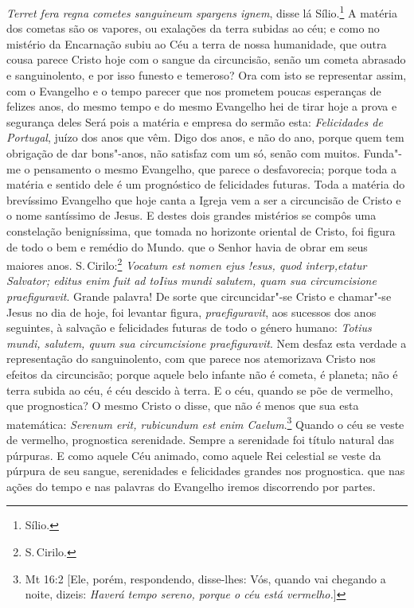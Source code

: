 \emph{Terret fera regna cometes sanguineum spargens ignem}, disse lá
Sílio.\footnote{Sílio.} A matéria dos cometas são os vapores, ou exalações da terra
subidas ao céu; e como no mistério da Encarnação subiu ao Céu a terra de
nossa humanidade, que outra cousa parece Cristo hoje com o sangue da
circuncisão, senão um cometa abrasado e sanguinolento, e por isso
funesto e temeroso? Ora com isto se representar assim, com o Evangelho e
o tempo parecer que nos prometem poucas esperanças de felizes anos, do
mesmo tempo e do mesmo Evangelho hei de tirar hoje a prova e segurança
deles Será pois a matéria e empresa do sermão esta: \emph{Felicidades
de Portugal}, juízo dos anos que vêm. Digo dos anos, e não do ano,
porque quem tem obrigação de dar bons"-anos, não satisfaz com um só,
senão com muitos. Funda"-me o pensamento o mesmo Evangelho, que parece o
desfavorecia; porque toda a matéria e sentido dele é um prognóstico de
felicidades futuras.
Toda a matéria do brevíssimo Evangelho que hoje canta a Igreja vem a ser
a circuncisão de Cristo e o nome santíssimo de Jesus. E destes dois
grandes mistérios se compôs uma constelação benigníssima, que tomada no
horizonte oriental de Cristo, foi figura de todo o bem e remédio do
Mundo. que o Senhor havia de obrar em seus maiores anos. S.\,Cirilo:\footnote{S.\,Cirilo.}
\emph{Vocatum est nomen ejus !esus, quod interp,etatur Salvator; editus
enim fuit ad toIius mundi salutem, quam sua circumcisione
praefiguravit}. Grande palavra! De sorte que circuncidar"-se Cristo e
chamar"-se Jesus no dia de hoje, foi levantar figura,
\emph{praefiguravit}, aos sucessos dos anos seguintes, à salvação e
felicidades futuras de todo o género humano: \emph{Totius mundi,
salutem, quum sua circumcisione praefiguravit}. Nem desfaz esta verdade
a representação do sanguinolento, com que parece nos atemorizava Cristo
nos efeitos da circuncisão; porque aquele belo infante não é cometa, é
planeta; não é terra subida ao céu, é céu descido à terra. E o céu,
quando se põe de vermelho, que prognostica? O mesmo Cristo o disse,
que não é menos que sua esta matemática: \emph{Serenum erit, rubicundum
est enim Caelum}.\footnote{Mt 16:2 [Ele, porém, respondendo, disse-lhes: Vós, quando vai chegando a noite, dizeis: \textit{Haverá tempo sereno, porque o céu está vermelho.}]} Quando o céu se veste de vermelho, prognostica
serenidade. Sempre a serenidade foi título natural das púrpuras. E como
aquele Céu animado, como aquele Rei celestial se veste da púrpura de seu
sangue, serenidades e felicidades grandes nos prognostica. que nas ações
do tempo e nas palavras do Evangelho iremos discorrendo por partes.

